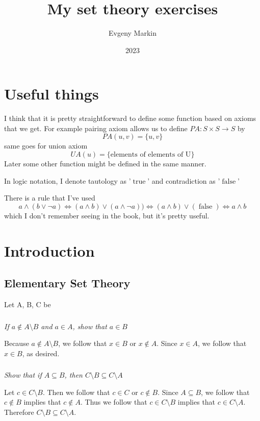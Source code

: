 \documentclass[11pt,oneside,titlepage]{book}
\title{My set theory exercises}
\author{Evgeny Markin}
\date{2023}
\DeclareMathOperator \lra {\Leftrightarrow}
\DeclareMathOperator \true {true}
\DeclareMathOperator \false {false}
\begin{document}
\maketitle
\tableofcontents

\chapter*{Useful things}

I think that it is pretty straightforward to define some function based on axioms that we get.
For example pairing axiom allows us to define $PA: S \times S \to S$ by
$$PA(u, v) = \{u, v\}$$
same goes for union axiom
$$UA(u) = \{\text{elements of elements of U}\}$$
Later some other function might be defined in the same manner.

In logic notation, I denote tautology as '$\true$' and contradiction as '$\false$'

There is a rule that I've used
$$a \land (b \lor \neg a) \lra (a \land b) \lor (a \land \neg a))
\lra (a \land b) \lor (\false) \lra a \land b$$
which I don't remember seeing in the book, but it's pretty useful.

\chapter{Introduction}

\section{Elementary Set Theory}

Let A, B, C be \subsection{}

\textit{If $a \notin A \setminus B$ and $a \in A$, show that $a \in B$}

Because $a \notin A \setminus B$, we follow that $x \in B$ or $x \notin A$. Since $x \in A$, we
follow that $x \in B$, as desired.

\subsection{}

\textit{Show that if $A \subseteq B$, then $C \setminus B \subseteq C \setminus A$}

Let $c \in C \setminus B$. Then we follow that $c \in C$ or $c \notin B$. Since $A \subseteq B$,
we follow that $c \notin B$ implies that $c \notin A$. Thus we follow that
$c \in C \setminus B$ implies that $c \in C \setminus A$. Therefore $C \setminus B \subseteq
C \setminus A$.
\end{document}
